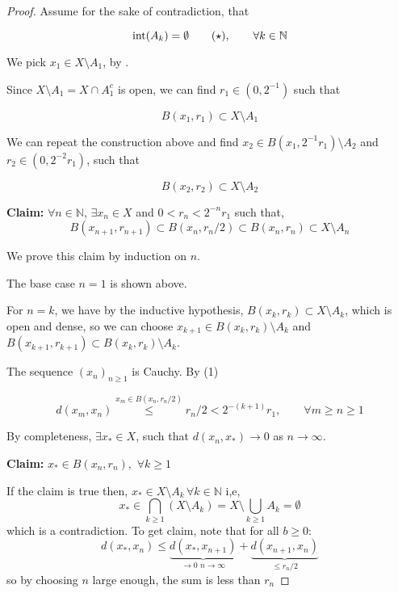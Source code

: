 \documentclass{article}
\begin{document}
    \begin{proof}
        Assume for the sake of contradiction, that

        \begin{equation*}
            \textrm{int}(A_k)=\emptyset \tag{$\star$}, \qquad \forall k \in \mathbb{N}
        \end{equation*}
        
        We pick $x_1\in X\setminus A_1$, by .
        
        Since $X\setminus A_1=X\cap A_1^c$ is open, we can find $r_1 \in (0,2^{-1})$ such that
        
        $$B(x_1,r_1)\subset X\setminus A_1$$  
        
        We can repeat the construction above and find $x_2\in B(x_1,2^{-1}r_1)\setminus A_2$ and $r_2 \in (0, 2^{-2} r_1)$, such that 
        
        $$B(x_2,r_2)\subset X\setminus A_2$$
        
        \textbf{Claim:} $\forall n \in \mathbb{N}$, $\exists x_n \in X$ and $0<r_n<2^{-n}r_1$ such that,  
        \begin{equation*}
            B(x_{n+1},r_{n+1})\subset B(x_n,r_n/2)\subset B(x_n,r_n)\subset X\setminus A_n
        \end{equation*}
            
        We prove this claim by induction on $n$.   
        
        The base case $n=1$ is shown above.    
        
        For $n=k$, we have by the inductive hypothesis, $B(x_k, r_k) \subset X \setminus A_k$, which is open and dense, so we can choose $x_{k+1} \in B(x_k, r_k) \setminus A_{k}$ and $B(x_{k+1}, r_{k+1}) \subset B(x_k, r_k) \setminus A_{k}$.  
        
        The sequence $(x_n)_{n \geq 1}$ is Cauchy. By (1)
        
        $$d(x_m,x_n)\stackrel{x_m\in B(x_n,r_n/2)}{\leq}r_n/2<2^{-(k+1)}r_1, \qquad \forall m\geq n\geq1$$
        
        By completeness, $\exists x_*\in X$, such that $d(x_n,x_*)\to0$ as $n\to \infty$.  
    
        \textbf{Claim:} $x_*\in B(x_n,r_n),\,\,\forall k\geq 1$  
        
        If the claim is true then,  $x_*\in X\setminus A_k\,\forall k \in \mathbb{N}$ i,e, 
        $$x_*\in\bigcap_{k\geq1}(X\setminus A_k)=X\setminus\bigcup_{k\geq1}A_k=\emptyset$$
        which is a contradiction. 
        To get claim, note that for all $b\geq0$:
        $$
        d(x_*,x_n)\leq \underbrace{{d(x_*,x_{n+1})}}_{\to0\,\,n\to\infty}+\underbrace{d(x_{n+1},x_n)}_{\leq r_n/2}
        $$
        so by choosing $n$ large enough, the sum is less than $r_n$
    \end{proof} 
\end{document}
